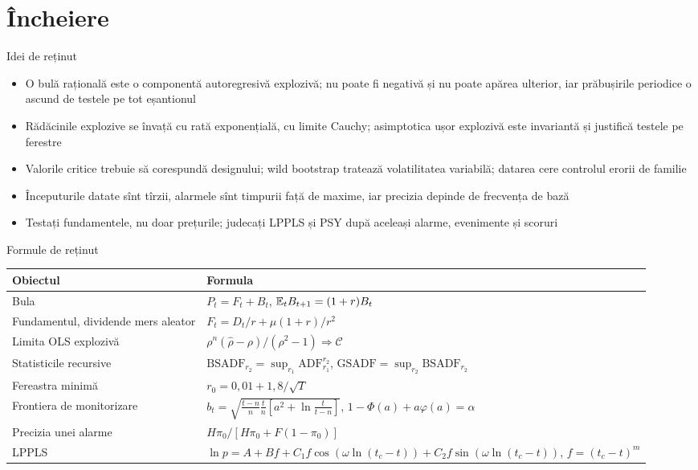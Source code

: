 \section{Încheiere}

\begin{frame}{Idei de reținut}
\itemsize{\small}
\begin{itemize}
    \item O bulă rațională este o componentă autoregresivă explozivă; nu poate fi negativă și nu poate apărea ulterior, iar prăbușirile periodice o ascund de testele pe tot eșantionul
    \item Rădăcinile explozive se învață cu rată exponențială, cu limite Cauchy; asimptotica ușor explozivă este invariantă și justifică testele pe ferestre
    \item Valorile critice trebuie să corespundă designului; wild bootstrap tratează volatilitatea variabilă; datarea cere controlul erorii de familie
    \item Începuturile datate sînt tîrzii, alarmele sînt timpurii față de maxime, iar precizia depinde de frecvența de bază
    \item Testați fundamentele, nu doar prețurile; judecați LPPLS și PSY după aceleași alarme, evenimente și scoruri
\end{itemize}
\end{frame}

\begin{frame}{Formule de reținut}
\itemsize{\small}
{\renewcommand{\arraystretch}{1.4}\begin{center}
\footnotesize
\begin{tabular}{ll}
\toprule
\textbf{Obiectul} & \textbf{Formula} \\
\midrule
Bula & $P_t = F_t + B_t$, $\mathbb{E}_t B_{t+1} = (1 + r)B_t$ \\
Fundamentul, dividende mers aleator & $F_t = D_t/r + \mu(1 + r)/r^2$ \\
Limita OLS explozivă & $\rho^n(\hat\rho - \rho)/(\rho^2 - 1) \Rightarrow \mathcal C$ \\
Statisticile recursive & $\mathrm{BSADF}_{r_2} = \sup_{r_1}\mathrm{ADF}_{r_1}^{r_2}$, $\mathrm{GSADF} = \sup_{r_2}\mathrm{BSADF}_{r_2}$ \\
Fereastra minimă & $r_0 = 0{,}01 + 1{,}8/\sqrt T$ \\
Frontiera de monitorizare & $b_t = \sqrt{\tfrac{t - n}{n}\tfrac{t}{n}[a^2 + \ln\tfrac{t}{t - n}]}$, $1 - \Phi(a) + a\varphi(a) = \alpha$ \\
Precizia unei alarme & $H\pi_0/[H\pi_0 + F(1 - \pi_0)]$ \\
LPPLS & $\ln p = A + B f + C_1 f\cos(\omega\ln(t_c - t)) + C_2 f\sin(\omega\ln(t_c - t))$, $f = (t_c - t)^m$ \\
\bottomrule
\end{tabular}
\end{center}
}
\end{frame}

